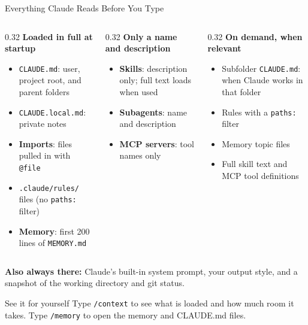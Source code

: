 \documentclass[aspectratio=169, 11pt]{beamer}
\begin{document}
\begin{frame}{Everything Claude Reads Before You Type}
  \footnotesize
  \begin{columns}[T]
    \begin{column}{0.32\textwidth}
      \textbf{Loaded in full at startup}
      \begin{itemize}
        \item \texttt{CLAUDE.md}: user, project root, and parent folders
        \item \texttt{CLAUDE.local.md}: private notes
        \item \textbf{Imports}: files pulled in with \texttt{@file}
        \item \texttt{.claude/rules/} files (no \texttt{paths:} filter)
        \item \textbf{Memory}: first 200 lines of \texttt{MEMORY.md}
      \end{itemize}
    \end{column}
    \begin{column}{0.32\textwidth}
      \textbf{Only a name and description}
      \begin{itemize}
        \item \textbf{Skills}: description only; full text loads when used
        \item \textbf{Subagents}: name and description
        \item \textbf{MCP servers}: tool names only
      \end{itemize}
    \end{column}
    \begin{column}{0.32\textwidth}
      \textbf{On demand, when relevant}
      \begin{itemize}
        \item Subfolder \texttt{CLAUDE.md}: when Claude works in that folder
        \item Rules with a \texttt{paths:} filter
        \item Memory topic files
        \item Full skill text and MCP tool definitions
      \end{itemize}
    \end{column}
  \end{columns}

  \vspace{0.2em}
  \textbf{Also always there:} Claude's built-in system prompt, your output style, and a snapshot of the working directory and git status.

  \vspace{0.1em}
  \begin{alertblock}{See it for yourself}
    Type \texttt{/context} to see what is loaded and how much room it takes. Type \texttt{/memory} to open the memory and CLAUDE.md files.
  \end{alertblock}
\end{frame}
\end{document}
